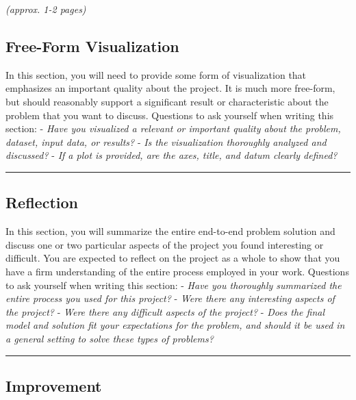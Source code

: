 \documentclass[12pt]{article}
\begin{document}
\emph{(approx. 1-2 pages)}

\subsection{Free-Form Visualization}\label{free-form-visualization}

In this section, you will need to provide some form of visualization
that emphasizes an important quality about the project. It is much more
free-form, but should reasonably support a significant result or
characteristic about the problem that you want to discuss. Questions to
ask yourself when writing this section: - \emph{Have you visualized a
relevant or important quality about the problem, dataset, input data, or
results?} - \emph{Is the visualization thoroughly analyzed and
discussed?} - \emph{If a plot is provided, are the axes, title, and
datum clearly defined?}

\begin{center}\rule{0.5\linewidth}{\linethickness}\end{center}

\subsection{Reflection}\label{reflection}

In this section, you will summarize the entire end-to-end problem
solution and discuss one or two particular aspects of the project you
found interesting or difficult. You are expected to reflect on the
project as a whole to show that you have a firm understanding of the
entire process employed in your work. Questions to ask yourself when
writing this section: - \emph{Have you thoroughly summarized the entire
process you used for this project?} - \emph{Were there any interesting
aspects of the project?} - \emph{Were there any difficult aspects of the
project?} - \emph{Does the final model and solution fit your
expectations for the problem, and should it be used in a general setting
to solve these types of problems?}

\begin{center}\rule{0.5\linewidth}{\linethickness}\end{center}

\subsection{Improvement}\label{improvement}
\end{document}
